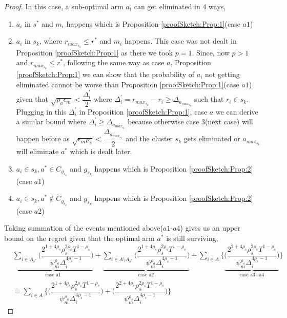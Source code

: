 \begin{proof}
	In this case, a sub-optimal arm $a_{i}$ can get eliminated in $4$ ways,
\begin{enumerate}
\item $a_{i}$ in $s^{*}$ and $m_{i}$ happens which is Proposition \ref{proofSketch:Prop:1}(case $a1$)
\item $a_{i}$ in $s_{k}$, where $r_{max_{s_{k}}}\leq r^{*}$ and $m_{i}$ happens. This case was not dealt in Proposition \ref{proofSketch:Prop:1} as there we took $p=1$. Since, now $p>1$ and $r_{max_{s_{k}}}\leq r^{*}$, following the same way as case $a$, Proposition \ref{proofSketch:Prop:1} we can show that the probability of $a_{i}$ not getting eliminated  cannot be worse than Proposition \ref{proofSketch:Prop:1}(case $a1$) given that $\sqrt{\rho_{a}\epsilon_{m}}< \dfrac{\Delta^{'}_{i}}{2}$ where $\Delta^{'}_{i}=r_{max_{s_{k}}} - r_{i}\geq\Delta_{a_{max_{s_{k}}}}$ such that $r_{i}\in s_{k}$. Plugging in this $\Delta^{'}_{i}$ in Proposition \ref{proofSketch:Prop:1}, case $a$ we can derive a similar bound where $\Delta^{'}_{i}\geq \Delta_{a_{max_{s_{k}}}}$ because otherwise case $3$(next case) will happen before as $\sqrt{\epsilon_{m}\rho_{s}}< \dfrac{\Delta_{a_{max_{s_{k}}}}}{2}$ and the cluster $s_{k}$ gets eliminated or $a_{max_{s_{k}}}$ will eliminate $a^{*}$ which is dealt later.
\item $a_{i}\in s_{k}, a^{*}\in C_{g_{s_{k}}}$ and $g_{s_{k}}$ happens which is Proposition \ref{proofSketch:Prop:2}(case $a1$)
\item $a_{i}\in s_{k}, a^{*}\notin C_{g_{s_{k}}}$ and $g_{s_{k}}$ happens which is Proposition \ref{proofSketch:Prop:2}(case $a2$)
\end{enumerate}
Taking summation of the events mentioned above($a1$-$a4$) gives us an upper bound on the regret given that the optimal arm $a^{*}$ is still surviving, 
\begin{align*}
 &\underbrace{\sum_{i\in A_{s^{*}}}\bigg(\dfrac{2^{1+4\rho_{s}}\rho_{s}^{2\rho_{s}}T^{1-\rho_{s}}}{\psi_{m}^{\rho_{a}}\Delta_{i}^{4\rho_{s}-1}}\bigg)}_{\text{case a1}} + \underbrace{\sum_{i\in A\setminus A_{s^{*}}}\bigg(\dfrac{2^{1+4\rho_{s}}\rho_{s}^{2\rho_{s}}T^{1-\rho_{s}}}{\psi_{m}^{\rho_{a}}\Delta_{i}^{4\rho_{s}-1}}\bigg)}_{\text{case a2}} + \sum_{i\in A}\bigg\lbrace \underbrace{\bigg(\dfrac{2^{2+4\rho_{s}}\rho_{s}^{2\rho_{s}}T^{1-\rho_{s}}}{\psi_{m}^{\rho_{s}}\Delta_{i}^{4\rho_{s}-1}}\bigg)}_{\text{case a3+a4}}\bigg\rbrace \\
& = \sum_{i\in A}\bigg\lbrace \bigg(\dfrac{2^{1+4\rho_{s}}\rho_{s}^{2\rho_{s}}T^{1-\rho_{s}}}{\psi_{m}^{\rho_{a}}\Delta_{i}^{4\rho_{s}-1}}\bigg) + \bigg(\dfrac{2^{2+4\rho_{s}}\rho_{s}^{2\rho_{s}}T^{1-\rho_{s}}}{\psi_{m}^{\rho_{s}}\Delta_{i}^{4\rho_{s}-1}}\bigg)\bigg\rbrace
\end{align*}



\end{proof}
